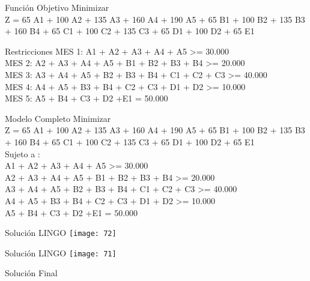 \documentclass{beamer}
\begin{document}
\begin{frame}[fragile]{Función Objetivo}
Minimizar\\
Z = 65 A1 + 100 A2 + 135 A3 + 160 A4 + 190 A5 + 65 B1 + 100 B2 + 135 B3 + 160 B4 + 65 C1 + 100 C2 + 135 C3 + 65 D1 + 100 D2 + 65 E1

\end{frame}

\begin{frame}[fragile]{Restricciones}
MES 1: A1 + A2 + A3 + A4 + A5 >= 30.000 \\
MES 2: A2 + A3 + A4 + A5 + B1 + B2 + B3 + B4 >= 20.000 \\
MES 3: A3 + A4 + A5 + B2 + B3 + B4 + C1 + C2 + C3 >= 40.000 \\
MES 4: A4 + A5 + B3 + B4 + C2 + C3 + D1 + D2 >= 10.000\\
MES 5: A5 + B4  + C3 + D2 +E1 = 50.000\\

\end{frame}

\begin{frame}[fragile]{Modelo Completo}
Minimizar\\
Z = 65 A1 + 100 A2 + 135 A3 + 160 A4 + 190 A5 + 65 B1 + 100 B2 + 135 B3 + 160 B4 + 65 C1 + 100 C2 + 135 C3 + 65 D1 + 100 D2 + 65 E1\\
Sujeto a :\\
A1 + A2 + A3 + A4 + A5 >= 30.000 \\
A2 + A3 + A4 + A5 + B1 + B2 + B3 + B4 >= 20.000 \\
A3 + A4 + A5 + B2 + B3 + B4 + C1 + C2 + C3 >= 40.000 \\
A4 + A5 + B3 + B4 + C2 + C3 + D1 + D2 >= 10.000\\
A5 + B4  + C3 + D2 +E1 = 50.000

\end{frame}

\begin{frame}[fragile]{Solución LINGO}
    \texttt{[image: 72]}
\end{frame}
\begin{frame}[fragile]{Solución LINGO}
    \texttt{[image: 71]}
\end{frame}

\begin{frame}[fragile]{Solución Final}
\end{frame}
\end{document}
